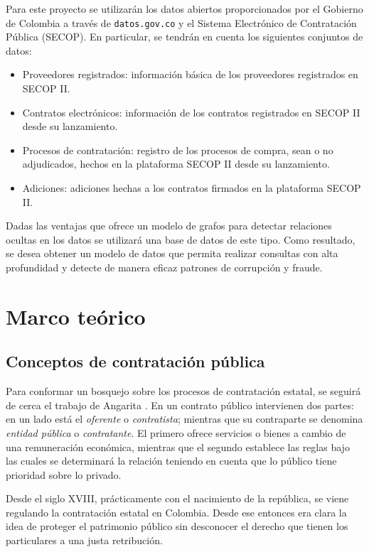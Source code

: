 \documentclass[11pt,letterpaper,oneside]{article}
\begin{document}
	Para este proyecto se utilizarán los datos abiertos proporcionados por el Gobierno de Colombia a través de \texttt{datos.gov.co} y el Sistema Electrónico de Contratación Pública (SECOP). En particular, se tendrán en cuenta los siguientes conjuntos de datos:
	\begin{itemize}
		\item Proveedores registrados: información básica de los proveedores registrados en SECOP II.
		\item Contratos electrónicos: información de los contratos registrados en SECOP II desde su lanzamiento.
		\item Procesos de contratación: registro de los procesos de compra, sean o no adjudicados, hechos en la plataforma SECOP II desde su lanzamiento.
		\item Adiciones: adiciones hechas a los contratos firmados en la plataforma SECOP II.
	\end{itemize}
	Dadas las ventajas que ofrece un modelo de grafos para detectar relaciones ocultas en los datos se utilizará una base de datos de este tipo. Como resultado, se desea obtener un modelo de datos que permita realizar consultas con alta profundidad y detecte de manera eficaz patrones de corrupción y fraude.
	
	\section{Marco teórico}
	
	\subsection{Conceptos de contratación pública}
	Para conformar un bosquejo sobre los procesos de contratación estatal, se seguirá de cerca el trabajo de Angarita \cite{Angarita-2018}. En un contrato público intervienen dos partes: en un lado está el {\em oferente} o {\em contratista}; mientras que su contraparte se denomina {\em entidad pública} o {\em contratante}. El primero ofrece servicios o bienes a cambio de una remuneración económica, mientras que el segundo establece las reglas bajo las cuales se determinará la relación teniendo en cuenta que lo público tiene prioridad sobre lo privado.
	
	Desde el siglo XVIII, prácticamente con el nacimiento de la república, se viene regulando la contratación estatal en Colombia. Desde ese entonces era clara la idea de proteger el patrimonio público sin desconocer el derecho que tienen los particulares a una justa retribución.
	
\end{document}
